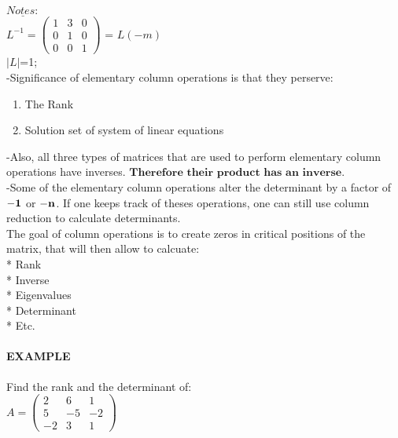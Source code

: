 \documentclass[]{article}
\let\oldparagraph\paragraph
\renewcommand{\paragraph}[1]{\oldparagraph{#1}\mbox{}}
\begin{document}
\(\underline{Notes:}\)\\

\(L^{-1} =\begin{pmatrix} 1 & 3 & 0\\ 0 & 1 & 0 \\ 0 & 0 & 1 \end{pmatrix}\)
= \(L(-m)\)\\
 \(|L|\)=1;\\

-Significance of elementary column operations is that they perserve:

\begin{enumerate}
\def\labelenumi{\arabic{enumi})}
\item
  The Rank
\item
  Solution set of system of linear equations
\end{enumerate}

-Also, all three types of matrices that are used to perform elementary
column operations have inverses.
\(\textbf{Therefore their product has an inverse.}\)\\

-Some of the elementary column operations alter the determinant by a
factor of \(\bold{-1}\) or \(\bold{-n}\). If one keeps track of theses
operations, one can still use column reduction to calculate
determinants.\\

The goal of column operations is to create zeros in critical positions
of the matrix, that will then allow to calcuate:\\
 * Rank\\
 * Inverse\\
 * Eigenvalues\\
 * Determinant\\
 * Etc.\\

\paragraph{\texorpdfstring{EXAMPLE\\
}{EXAMPLE }}\label{example-11}

Find the rank and the determinant of:\\

\(A =\begin{pmatrix} 2 & 6 & 1\\ 5 & -5 & -2 \\ -2 & 3 & 1 \end{pmatrix}\)\\
\end{document}
